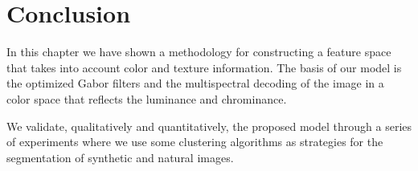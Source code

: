 %    
%                  

\section{Conclusion}
In this chapter we have shown a methodology for constructing a feature space that takes into account color and texture information. The basis of our model is the optimized Gabor filters and the multispectral decoding of the image in a color space that reflects the luminance and chrominance.

We validate, qualitatively and quantitatively, the proposed model through a series of experiments where we use some clustering algorithms as strategies for the segmentation of synthetic and natural images.

